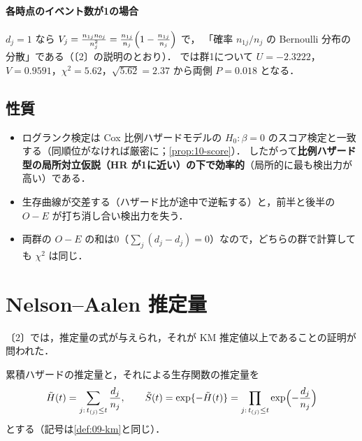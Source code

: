 \paragraph{各時点のイベント数が1の場合}
$d_j=1$ なら $V_j=\frac{n_{1j}n_{0j}}{n_j^2}=\frac{n_{1j}}{n_j}\Bigl(1-\frac{n_{1j}}{n_j}\Bigr)$ で，
「確率 $n_{1j}/n_j$ の Bernoulli 分布の分散」である（〔2〕の説明のとおり）．
 では群1について $U=-2.3222$，$V=0.9591$，$\chi^2=5.62$，$\sqrt{5.62}=2.37$ から両側 $P=0.018$ となる．

\subsection{性質}
\begin{itemize}
\item ログランク検定は Cox 比例ハザードモデルの $H_0:\beta=0$ のスコア検定と一致する（同順位がなければ厳密に；\cref{prop:10-score}）．
      したがって\textbf{比例ハザード型の局所対立仮説（HR が1に近い）の下で効率的}（局所的に最も検出力が高い）である．
\item 生存曲線が交差する（ハザード比が途中で逆転する）と，前半と後半の $O-E$ が打ち消し合い検出力を失う．
\item 両群の $O-E$ の和は0（$\sum_j(d_j-d_j)=0$）なので，どちらの群で計算しても $\chi^2$ は同じ．
\end{itemize}

\section{Nelson--Aalen 推定量}\label{sec:09-na}
〔2〕では，推定量の式が与えられ，それが KM 推定値以上であることの証明が問われた．
\begin{teigi}\label{def:09-na}
累積ハザードの推定量と，それによる生存関数の推定量を
\begin{equation}
\tilde H(t)=\sum_{j:\,t_{(j)}\le t}\frac{d_j}{n_j},\qquad \tilde S(t)=\exp\{-\tilde H(t)\}=\prod_{j:\,t_{(j)}\le t}\exp\Bigl(-\frac{d_j}{n_j}\Bigr)\label{eq:09-na}
\end{equation}
とする（記号は\cref{def:09-km}と同じ）．
\end{teigi}
